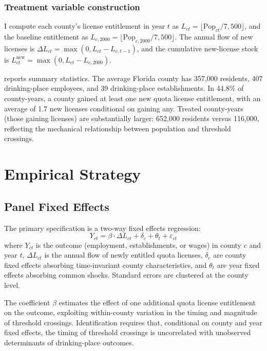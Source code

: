 \documentclass[12pt]{article}
\begin{document}
\subsubsection*{Treatment variable construction} I compute each county's license entitlement in year $t$ as $L_{ct} = \lfloor \text{Pop}_{ct} / 7{,}500 \rfloor$, and the baseline entitlement as $L_{c,2000} = \lfloor \text{Pop}_{c,2000} / 7{,}500 \rfloor$. The annual flow of new licenses is $\Delta L_{ct} = \max(0, L_{ct} - L_{c,t-1})$, and the cumulative new-license stock is $L_{ct}^{\text{new}} = \max(0, L_{ct} - L_{c,2000})$.



 reports summary statistics. The average Florida county has 357,000 residents, 407 drinking-place employees, and 39 drinking-place establishments. In 44.8\% of county-years, a county gained at least one new quota license entitlement, with an average of 1.7 new licenses conditional on gaining any. Treated county-years (those gaining licenses) are substantially larger: 652,000 residents versus 116,000, reflecting the mechanical relationship between population and threshold crossings.

\section{Empirical Strategy}

\subsection{Panel Fixed Effects}

The primary specification is a two-way fixed effects regression:
\begin{equation}\label{eq:twfe}
Y_{ct} = \beta \cdot \Delta L_{ct} + \delta_c + \theta_t + \varepsilon_{ct}
\end{equation}
where $Y_{ct}$ is the outcome (employment, establishments, or wages) in county $c$ and year $t$, $\Delta L_{ct}$ is the annual flow of newly entitled quota licenses, $\delta_c$ are county fixed effects absorbing time-invariant county characteristics, and $\theta_t$ are year fixed effects absorbing common shocks. Standard errors are clustered at the county level.

The coefficient $\beta$ estimates the effect of one additional quota license entitlement on the outcome, exploiting within-county variation in the timing and magnitude of threshold crossings. Identification requires that, conditional on county and year fixed effects, the timing of threshold crossings is uncorrelated with unobserved determinants of drinking-place outcomes.
\end{document}
